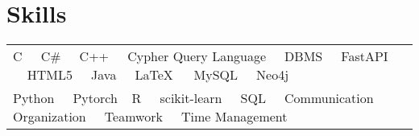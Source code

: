 \documentclass[a4paper,11pt]{article}
\begin{document}
\section{Skills}

\begin{tabularx}{\linewidth}{@{}l X@{}}
C $\>$ $\>$ C\# $\>$ $\>$ C++  $\>$ $\>$ Cypher Query Language $\>$ $\>$ DBMS $\>$ $\>$ FastAPI $\>$ $\>$ HTML5 $\>$ $\>$ Java $\>$ $\>$ \LaTeX\ $\>$ $\>$ MySQL $\>$ $\>$ Neo4j \\ Python $\>$ $\>$ Pytorch $\>$ $\>$R $\>$ $\>$ scikit-learn $\>$ $\>$ SQL $\>$ $\>$  Communication $\>$ $\>$ Organization $\>$ $\>$ Teamwork $\>$ $\>$ Time Management
\end{tabularx}

\vfill
{}
\end{document}
